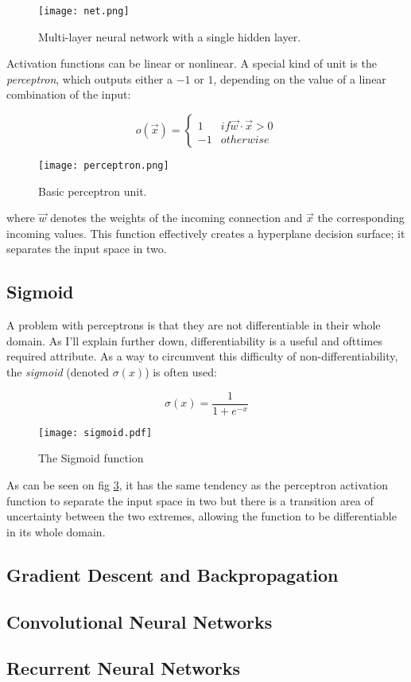 \begin{figure}
\label{fig.neuralnet}
\center
\texttt{[image: net.png]}
\caption{Multi-layer neural network with a single hidden layer.}
\end{figure}

Activation functions can be linear or nonlinear.
A special kind of unit is the \textit{perceptron},
which outputs either a $-1$ or $1$,
depending on the value of a linear combination of the input:

\begin{equation}
\label{eq.perceptron}
o(\overrightarrow{x}) = \begin{cases}
1 & if \overrightarrow{w}\cdot\overrightarrow{x} > 0 \\
-1 & otherwise
\end{cases}
\end{equation}

\begin{figure}
\label{fig.ml.perceptron}
\center
\texttt{[image: perceptron.png]}
\caption{Basic perceptron unit.}
\end{figure}

where $\overrightarrow{w}$ denotes the weights of the incoming connection
and $\overrightarrow{x}$ the corresponding incoming values.
This function effectively creates a hyperplane decision surface;
it separates the input space in two.

\subsection{Sigmoid}
A problem with perceptrons
is that they are not differentiable
in their whole domain.
As I'll explain further down, %
differentiability is a useful and ofttimes required attribute.
As a way to circumvent this difficulty of non-differentiability,
the \textit{sigmoid} (denoted $\sigma(x)$) is often used:

\begin{equation}
\label{eq.ml.sigmoid}
\sigma(x) = \frac{1}{1 + e^{-x}}
\end{equation}

\begin{figure}[h]
\center
\texttt{[image: sigmoid.pdf]}
\caption{The Sigmoid function}
\label{fig.ml.sigmoid}
\end{figure}

As can be seen on fig \ref{fig.ml.sigmoid},
it has the same tendency as the perceptron activation function
to separate the input space in two
but there is a transition area of uncertainty between the two extremes,
allowing the function to be differentiable in its whole domain.

\subsection{Gradient Descent and Backpropagation}

\subsection{Convolutional Neural Networks}

\subsection{Recurrent Neural Networks}